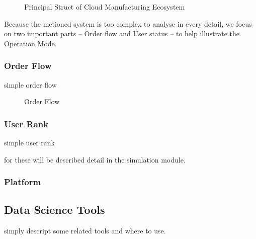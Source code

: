 \begin{figure}[!h]
\centering
\resizebox{0.7\textwidth}{!}{
}
\caption{Principal Struct of Cloud Manufacturing Ecosystem}
\end{figure}
Because the metioned system is too complex to analyse in every detail, we focus on two important parts -- Order flow and User status -- to help illustrate the Operation Mode.

\subsubsection{Order Flow}
simple order flow 
\begin{figure}[!h]
\centering\small
\resizebox{0.45\textwidth}{!}{
}
\caption{Order Flow}
\end{figure}
\subsubsection{User Rank}
simple user rank

for these will be described detail in the simulation module.
\subsubsection{Platform}


\subsection{Data Science Tools}
simply descript some related tools and where to use.
